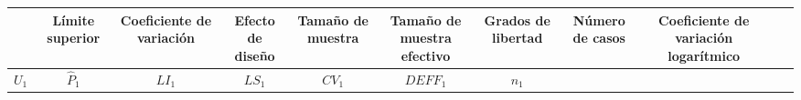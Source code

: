\documentclass[12pt,spanish,]{book}
\begin{document}
\begin{longtable}[]{@{}ccccccccccc@{}}
\begin{minipage}[b]{0.04\columnwidth}
\end{minipage} & \begin{minipage}[b]{0.04\columnwidth}\centering
Límite superior\strut
\end{minipage} & \begin{minipage}[b]{0.07\columnwidth}\centering
Coeficiente de variación\strut
\end{minipage} & \begin{minipage}[b]{0.05\columnwidth}\centering
Efecto de diseño\strut
\end{minipage} & \begin{minipage}[b]{0.05\columnwidth}\centering
Tamaño de muestra\strut
\end{minipage} & \begin{minipage}[b]{0.11\columnwidth}\centering
Tamaño de muestra efectivo\strut
\end{minipage} & \begin{minipage}[b]{0.05\columnwidth}\centering
Grados de libertad\strut
\end{minipage} & \begin{minipage}[b]{0.04\columnwidth}\centering
Número de casos\strut
\end{minipage} & \begin{minipage}[b]{0.11\columnwidth}\centering
Coeficiente de variación logarítmico\strut
\end{minipage}\tabularnewline
\midrule
\endhead
\begin{minipage}[t]{0.09\columnwidth}\centering
\(U_1\)\strut
\end{minipage} & \begin{minipage}[t]{0.07\columnwidth}\centering
\(\hat{P}_1\)\strut
\end{minipage} & \begin{minipage}[t]{0.04\columnwidth}\centering
\(LI_1\)\strut
\end{minipage} & \begin{minipage}[t]{0.04\columnwidth}\centering
\(LS_1\)\strut
\end{minipage} & \begin{minipage}[t]{0.07\columnwidth}\centering
\(CV_1\)\strut
\end{minipage} & \begin{minipage}[t]{0.05\columnwidth}\centering
\(DEFF_1\)\strut
\end{minipage} & \begin{minipage}[t]{0.05\columnwidth}\centering
\(n_1\)\strut
\end{minipage} & \begin{minipage}[t]{0.11\columnwidth}\centering

\end{minipage}
\end{longtable}
\end{document}
